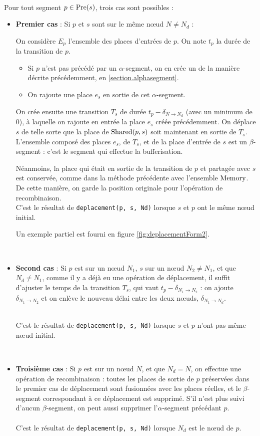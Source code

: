 ~ \\
Pour tout segment $p \in \operatorname{Pre}(s)$, trois cas sont possibles : 
\begin{itemize}
\item {\textbf{Premier cas} : Si $p$ et $s$ sont sur le même nœud $N \neq N_d$ :

On considère $E_{p}$ l'ensemble des places d'entrées de $p$.
On note $t_p$ la durée de la transition de $p$.

\begin{itemize}
\item Si $p$ n'est pas précédé par un $\alpha$-segment, on en crée un de la manière décrite précédemment, en \ref{section.alphasegment}.
\item On rajoute une place $e_s$ en sortie de cet $\alpha$-segment.
\end{itemize}
\vspace{1em}

On crée ensuite une transition $T_s$ de durée $t_p - \delta_{N \rightarrow N_d}$ (avec un minimum de 0), à laquelle on rajoute en entrée la place $e_s$ créée précédemment. On déplace $s$ de telle sorte que la place de $\operatorname{Shared}(p, s)$ soit maintenant en sortie de $T_s$.
L'ensemble composé des places $e_s$, de $T_s$, et de la place d'entrée de $s$ est un $\beta$-segment : c'est le segment qui effectue la bufferisation.

Néanmoins, la place qui était en sortie de la transition de $p$ et partagée avec $s$ est conservée, comme dans la méthode précédente avec l'ensemble $\operatorname{Memory}$. De cette manière, on garde la position originale pour l'opération de recombinaison.
~ \\

C'est le résultat de \texttt{deplacement(p, s, Nd)} lorsque $s$ et $p$ ont le même nœud initial.

Un exemple partiel est fourni en figure \ref{fig:deplacementForm2}.
}
\\
\item{\textbf{Second cas} : Si $p$ est sur un nœud $N_1$, $s$ sur un nœud $N_2 \neq N_1$, et que $N_d \neq N_1$, comme il y a déjà eu une opération de déplacement, il suffit d'ajuster le temps de la transition $T_s$, qui vaut $t_p - \delta_{N_1 \rightarrow N_2}$ : on ajoute $\delta_{N_1 \rightarrow N_2}$ et on enlève le nouveau délai entre les deux nœuds, $\delta_{N_1 \rightarrow N_d}$.

~ \\
C'est le résultat de \texttt{deplacement(p, s, Nd)} lorsque $s$ et $p$ n'ont pas même nœud initial.
}
\\
\item \textbf{Troisième cas} : Si $p$ est sur un nœud $N$, et que $N_d = N$, on effectue une opération de recombinaison : toutes les places de sortie de $p$ préservées dans le premier cas de déplacement sont fusionnées avec les places réelles, et le $\beta$-segment correspondant à ce déplacement est supprimé. S'il n'est plus suivi d'aucun $\beta$-segment, on peut aussi supprimer l'$\alpha$-segment précédant $p$.
~ \\
~ \\
C'est le résultat de \texttt{deplacement(p, s, Nd)} lorsque $N_d$ est le nœud de $p$.
\end{itemize}

